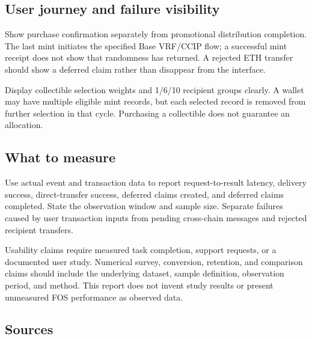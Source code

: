 \documentclass[
  10pt,
  letterpaper,
]{article}
\begin{document}
\subsection{User journey and failure
visibility}\label{user-journey-and-failure-visibility}

Show purchase confirmation separately from promotional distribution
completion. The last mint initiates the specified Base VRF/CCIP flow; a
successful mint receipt does not show that randomness has returned. A
rejected ETH transfer should show a deferred claim rather than disappear
from the interface.

Display collectible selection weights and 1/6/10 recipient groups
clearly. A wallet may have multiple eligible mint records, but each
selected record is removed from further selection in that cycle.
Purchasing a collectible does not guarantee an allocation.

\subsection{What to measure}\label{what-to-measure}

Use actual event and transaction data to report request-to-result
latency, delivery success, direct-transfer success, deferred claims
created, and deferred claims completed. State the observation window and
sample size. Separate failures caused by user transaction inputs from
pending cross-chain messages and rejected recipient transfers.

Usability claims require measured task completion, support requests, or
a documented user study. Numerical survey, conversion, retention, and
comparison claims should include the underlying dataset, sample
definition, observation period, and method. This report does not invent
study results or present unmeasured FOS performance as observed data.

\subsection{Sources}\label{sources-1}
\end{document}
